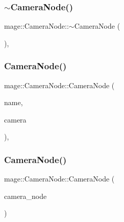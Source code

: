 \subsubsection{\texorpdfstring{$\sim$\+Camera\+Node()}{~CameraNode()}}
{\footnotesize\ttfamily mage\+::\+Camera\+Node\+::$\sim$\+Camera\+Node (\begin{DoxyParamCaption}{ }\end{DoxyParamCaption})\hspace{0.3cm}{\ttfamily [virtual]}, {\ttfamily [default]}}

\hypertarget{classmage_1_1_camera_node_a943cecfc5f96ad22f0f64d0f7b3f3640}{}\label{classmage_1_1_camera_node_a943cecfc5f96ad22f0f64d0f7b3f3640} 
\subsubsection{\texorpdfstring{Camera\+Node()}{CameraNode()}\hspace{0.1cm}{\footnotesize\ttfamily [1/3]}}
{\footnotesize\ttfamily mage\+::\+Camera\+Node\+::\+Camera\+Node (\begin{DoxyParamCaption}\item[{const string \&}]{name,  }\item[{\hyperlink{namespacemage_a8c307fbcc33bce9b7f2aa4c26c3b95cf}{Unique\+Ptr}$<$ \hyperlink{classmage_1_1_camera}{Camera} $>$ \&\&}]{camera }\end{DoxyParamCaption})\hspace{0.3cm}{\ttfamily [explicit]}, {\ttfamily [protected]}}

\hypertarget{classmage_1_1_camera_node_aa0becc29c416c313ebda763edb1b2181}{}\label{classmage_1_1_camera_node_aa0becc29c416c313ebda763edb1b2181} 
\subsubsection{\texorpdfstring{Camera\+Node()}{CameraNode()}\hspace{0.1cm}{\footnotesize\ttfamily [2/3]}}
{\footnotesize\ttfamily mage\+::\+Camera\+Node\+::\+Camera\+Node (\begin{DoxyParamCaption}\item[{const \hyperlink{classmage_1_1_camera_node}{Camera\+Node} \&}]{camera\+\_\+node }\end{DoxyParamCaption})\hspace{0.3cm}{\ttfamily [protected]}}

